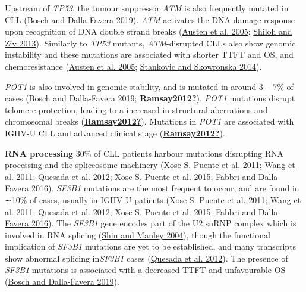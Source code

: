 \documentclass[11pt, a4paper, twosided]{book}
\begin{document}
Upstream of \emph{TP53}, the tumour suppressor \emph{ATM} is also frequently mutated in CLL (\protect\hyperlink{ref-Bosch2019}{Bosch and Dalla-Favera 2019}). \emph{ATM} activates the DNA damage response upon recognition of DNA double strand breaks (\protect\hyperlink{ref-Austen2005}{Austen et al. 2005}; \protect\hyperlink{ref-Shiloh2013}{Shiloh and Ziv 2013}). Similarly to \emph{TP53} mutants, \emph{ATM}-disrupted CLLs also show genomic instability and these mutations are associated with shorter TTFT and OS, and chemoresistance (\protect\hyperlink{ref-Austen2005}{Austen et al. 2005}; \protect\hyperlink{ref-Stankovic2014}{Stankovic and Skowronska 2014}).

\emph{POT1} is also involved in genomic stability, and is mutated in around 3 -- 7\% of cases (\protect\hyperlink{ref-Bosch2019}{Bosch and Dalla-Favera 2019}; \protect\hyperlink{ref-Ramsay2012}{\textbf{Ramsay2012?}}). \emph{POT1} mutations disrupt telomere protection, leading to a increased in structural aberrations and chromosomal breaks (\protect\hyperlink{ref-Ramsay2012}{\textbf{Ramsay2012?}}). Mutations in \emph{POT1} are associated with IGHV-U CLL and advanced clinical stage (\protect\hyperlink{ref-Ramsay2012}{\textbf{Ramsay2012?}}).

\textbf{RNA processing}
30\% of CLL patients harbour mutations disrupting RNA processing and the spliceosome machinery (\protect\hyperlink{ref-Puente2011}{Xose S. Puente et al. 2011}; \protect\hyperlink{ref-Wang2011}{Wang et al. 2011}; \protect\hyperlink{ref-Quesada2012}{Quesada et al. 2012}; \protect\hyperlink{ref-Puente2015}{Xose S. Puente et al. 2015}; \protect\hyperlink{ref-Fabbri2016}{Fabbri and Dalla-Favera 2016}).
\emph{SF3B1} mutations are the most frequent to occur, and are found in ∼10\% of cases, usually in IGHV-U patients (\protect\hyperlink{ref-Puente2011}{Xose S. Puente et al. 2011}; \protect\hyperlink{ref-Wang2011}{Wang et al. 2011}; \protect\hyperlink{ref-Quesada2012}{Quesada et al. 2012}; \protect\hyperlink{ref-Puente2015}{Xose S. Puente et al. 2015}; \protect\hyperlink{ref-Fabbri2016}{Fabbri and Dalla-Favera 2016}). The \emph{SF3B1} gene encodes part of the U2 snRNP complex which is involved in RNA splicing (\protect\hyperlink{ref-Shin2004}{Shin and Manley 2004}), though the functional implication of \emph{SF3B1} mutations are yet to be established, and many transcripts show abnormal splicing in\emph{SF3B1} cases (\protect\hyperlink{ref-Quesada2012}{Quesada et al. 2012}). The presence of \emph{SF3B1} mutations is associated with a decreased TTFT and unfavourable OS (\protect\hyperlink{ref-Bosch2019}{Bosch and Dalla-Favera 2019}).
\end{document}
